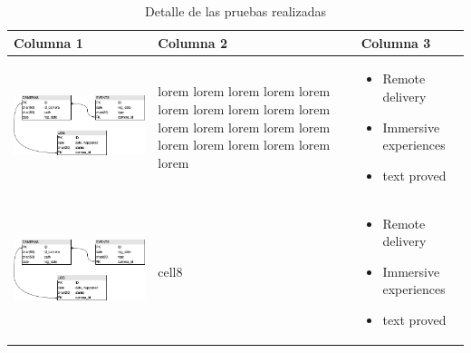 \begin{table}[H]
    \caption{Detalle de las pruebas realizadas}
    \begin{center}
        \begin{tabular}{|>{\centering}p{}|>{\centering}m{}|m{}<{\centering}|} 
            \hline
            \textbf{Columna 1} & \textbf{Columna 2} & \textbf{Columna 3} \\
            \hline
            \begin{minipage}{.3\textwidth}
                \includegraphics[width=\linewidth]{img/capitulo_4/db.png}
            \end{minipage}& lorem lorem lorem lorem lorem lorem lorem lorem lorem lorem lorem lorem lorem lorem lorem lorem lorem lorem lorem lorem lorem
            & \begin{itemize} 
                \item Remote delivery 
                \item Immersive experiences
                \item text proved
            \end{itemize} \\ 
            \hline
            \begin{minipage}{.3\textwidth}
                \includegraphics[width=\linewidth]{img/capitulo_4/db.png}
            \end{minipage} & cell8 & \begin{itemize} 
                \item Remote delivery 
                \item Immersive experiences
                \item text proved
            \end{itemize} \\
            \hline
        \end{tabular}
    \end{center}
\end{table}

